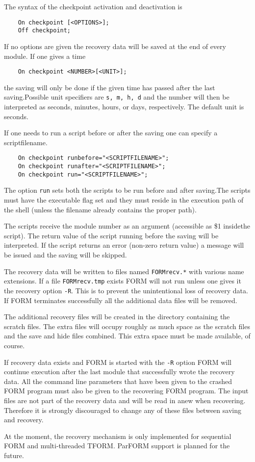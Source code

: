 The syntax of the checkpoint activation and deactivation is
\begin{verbatim}
    On checkpoint [<OPTIONS>];
    Off checkpoint;
\end{verbatim}

If no options are given the recovery data will be saved at the end of every
module. If one gives a time
\begin{verbatim}
    On checkpoint <NUMBER>[<UNIT>];
\end{verbatim}
the saving will only be done if the given time has passed after the last 
saving.Possible unit specifiers are {\tt s, m, h, d} and the number will 
then be interpreted as seconds, minutes, hours, or days, respectively. The 
default unit is seconds.

If one needs to run a script before or after the saving 
one can specify a scriptfilename.
\begin{verbatim}
    On checkpoint runbefore="<SCRIPTFILENAME>";
    On checkpoint runafter="<SCRIPTFILENAME>";
    On checkpoint run="<SCRIPTFILENAME>";
\end{verbatim}
The option {\tt run} sets both the scripts to be run before and 
after saving.The scripts must have the executable flag set and they must 
reside in the execution path of the shell (unless the filename 
already contains the proper path).

The scripts receive the module number as an argument 
(accessible as \$1 insidethe script). The return value of the script 
running before the saving will be interpreted. If the script returns an 
error (non-zero return value) a message will be issued and the saving will 
be skipped. 

The recovery data will be written to files named {\tt FORMrecv.*} with 
various name extensions. If a file {\tt FORMrecv.tmp} exists FORM will not 
run unless one gives it the recovery option
{\tt -R}. This is to prevent the unintentional loss of recovery data. If 
FORM terminates successfully all the additional data files will be removed.

The additional recovery files will be created in the directory containing 
the scratch files.  The extra files will occupy roughly as much space as 
the scratch files and the save and 
hide files combined. This extra space must be made 
available, of course.

If recovery data exists and FORM is started with the {\tt -R} option FORM 
will continue execution after the last module that successfully wrote the 
recovery data. All the command line parameters that have been given to the 
crashed FORM program must also be given to the 
recovering FORM program. The input files are not part of the recovery data 
and will be read in anew when recovering. Therefore it is strongly 
discouraged to change any of these files between saving and recovery.

At the moment, the recovery mechanism is only implemented for sequential FORM
and multi-threaded TFORM.  ParFORM support is planned for the future.

